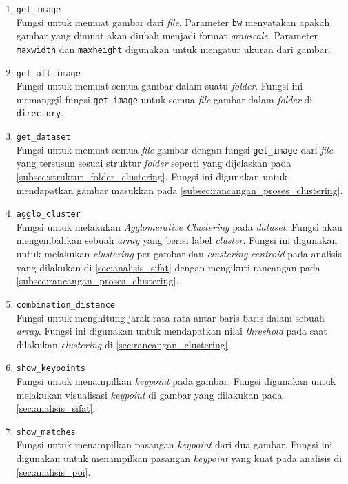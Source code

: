 \begin{enumerate}
	\item \texttt{get\_image} \\
	Fungsi untuk memuat gambar dari \textit{file}. Parameter \texttt{bw} menyatakan apakah gambar yang dimuat akan diubah menjadi format \textit{grayscale}. Parameter \texttt{maxwidth} dan \texttt{maxheight} digunakan untuk mengatur ukuran dari gambar.
	\item \texttt{get\_all\_image} \\
	Fungsi untuk memuat semua gambar dalam suatu \textit{folder}. Fungsi ini memanggil fungsi \texttt{get\_image} untuk semua \textit{file} gambar dalam \textit{folder} di \texttt{directory}.
	\item \texttt{get\_dataset} \\
	Fungsi untuk memuat semua \textit{file} gambar dengan fungsi \texttt{get\_image} dari \textit{file} yang tersusun sesuai struktur \textit{folder} seperti yang dijelaskan pada \ref{subsec:struktur_folder_clustering}. Fungsi ini digunakan untuk mendapatkan gambar masukkan pada \ref{subsec:rancangan_proses_clustering}.
	\item \texttt{agglo\_cluster} \\
	Fungsi untuk melakukan \textit{Agglomerative Clustering} pada \textit{dataset}. Fungsi akan mengembalikan sebuah \textit{array} yang berisi label \textit{cluster}. Fungsi ini digunakan untuk melakukan \textit{clustering} per gambar dan \textit{clustering} \textit{centroid} pada analisis yang dilakukan di \ref{sec:analisis_sifat} dengan mengikuti rancangan pada \ref{subsec:rancangan_proses_clustering}.
	\item \texttt{combination\_distance} \\
	Fungsi untuk menghitung jarak rata-rata antar baris baris dalam sebuah \textit{array}. Fungsi ini digunakan untuk mendapatkan nilai \textit{threshold} pada saat dilakukan \textit{clustering} di \ref{sec:rancangan_clustering}.
	\item \texttt{show\_keypoints} \\
	Fungsi untuk menampilkan \textit{keypoint} pada gambar. Fungsi digunakan untuk melakukan visualisasi \textit{keypoint} di gambar yang dilakukan pada \ref{sec:analisis_sifat}.
	\item \texttt{show\_matches} \\
	Fungsi untuk menampilkan pasangan \textit{keypoint} dari dua gambar. Fungsi ini digunakan untuk menampilkan pasangan \textit{keypoint} yang kuat pada analisis di \ref{sec:analisis_poi}.
\end{enumerate}



